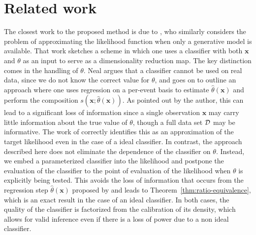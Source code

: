 \documentclass[12pt]{article}
\numberwithin{equation}{section}
\theoremstyle{plain}
\newcommand{\glnote}[1]{\textcolor{red}{[GL: #1]}}
\begin{document}

\section{Related work}
\label{sec:related}

The closest work to the proposed method is due to \cite{Neal:2007zz}, who
similarly considers the problem of approximating the likelihood function when
only a generative model is available. That work sketches a scheme in which one
uses a classifier with both $\mathbf{x}$ and $\theta$ as an input to serve as a
dimensionality reduction map. The key distinction comes in the handling of
$\theta$.  Neal argues that a classifier cannot be used on real data, since we
do not know the correct value for $\theta$, and goes on to outline an approach
where one uses regression on a per-event basis to estimate
$\hat{\theta}(\mathbf{x})$ and perform the composition $s(\mathbf{x};
\hat{\theta}(\mathbf{x}))$. As pointed out by the author, this can lead to a
significant loss of information since a single observation $\mathbf{x}$ may
carry little information about the true value of $\theta$, though a full data
set ${\cal D}$ may be informative.
The work of \cite{Neal:2007zz} correctly identifies this as
an approximation of the target likelihood even in the case of a ideal
classifier. In contrast, the approach described here does not eliminate the
dependence of the classifier on $\theta$.
Instead, we embed a parameterized classifier
into the likelihood and postpone the evaluation of the classifier to the point
of evaluation of the likelihood when $\theta$ is explicitly being tested. This
avoids the loss of information that occurs from the regression step
$\hat{\theta}(\mathbf{x})$ proposed by \cite{Neal:2007zz} and leads to
Theorem~\ref{thm:ratio-equivalence}, which is an exact result in the case of an
ideal classifier. In both cases, the quality of the classifier is factorized
from the calibration of its density, which allows for valid inference even if
there is a loss of power due to a non ideal classifier.
\end{document}
